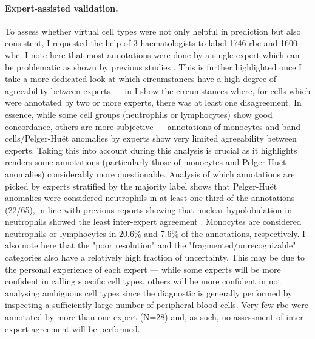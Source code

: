 \begin{figure}[!ht]
    \label{fig:multi-objective-importance}
\end{figure}

\begin{figure}[!ht]
    \label{fig:rbc-mo-examples}
\end{figure}

\paragraph{Expert-assisted validation.} To assess whether virtual cell types were not only helpful in prediction but also consistent, I requested the help of 3 haematologists to label 1746 \ac{rbc} and 1600 \ac{wbc}. I note here that most annotations were done by a single expert which can be problematic as shown by previous studies \cite{De_Swart2017-wc,Howe2004-mn,Goasguen2009-dn,Foucar2020-uz}. This is further highlighted once I take a more dedicated look at which circumstances have a high degree of agreeability between experts --- in  I show the circumstances where, for cells which were annotated by two or more experts, there was at least one disagreement. In essence, while some cell groups (neutrophils or lymphocytes) show good concordance, others are more subjective --- annotations of monocytes and band cells/Pelger-Huët anomalies by experts show very limited agreeability between experts. Taking this into account during this analysis is crucial as it highlights renders some annotations (particularly those of monocytes and Pelger-Huët anomalies) considerably more questionable. Analysis of which annotations are picked by experts stratified by the majority label shows that Pelger-Huët anomalies were considered neutrophils in at least one third of the annotations (22/65), in line with previous reports showing that nuclear hypolobulation in neutrophils showed the least inter-expert agreement \cite{Weinberg2015-ra}. Monocytes are considered neutrophils or lymphocytes in 20.6\% and 7.6\% of the annotations, respectively. I also note here that the "poor resolution" and the "fragmented/unrecognizable" categories also have a relatively high fraction of uncertainty. This may be due to the personal experience of each expert --- while some experts will be more confident in calling specific cell types, others will be more confident in not analysing ambiguous cell types since the diagnostic is generally performed by inspecting a sufficiently large number of peripheral blood cells. Very few \ac{rbc} were annotated by more than one expert (N=28) and, as such, no assessment of inter-expert agreement will be performed.

